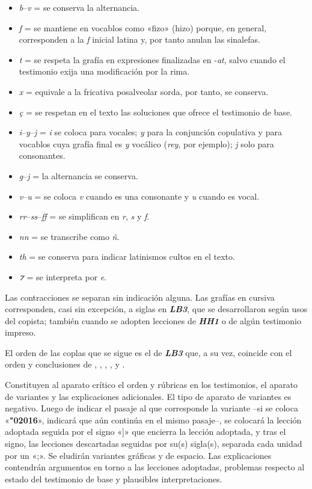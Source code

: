 \documentclass[11pt]{article}
\newcommand{\eg}{{\emph{\textbf{LB3}}}}
\newcommand{\hh}{\emph{\textbf{HH1}}}
\newcommand{\comillas}[1]{«#1»}
\begin{document}
%
\begin{itemize}[label=--]%
\item \emph{b}--\emph{v} = se conserva la alternancia.
\item \emph{f} = se mantiene en vocablos como \comillas{fizo} (hizo) porque, en general, corresponden a la \emph{f} inicial latina y, por tanto anulan las sinalefas.
\item \emph{t} = se respeta la grafía en expresiones finalizadas en -\emph{at}, salvo cuando el testimonio exija una modificación por la rima.
\item \emph{x} = equivale a la fricativa posalveolar sorda, por tanto, se conserva.
\item \emph{ç} = se respetan en el texto las soluciones que ofrece el testimonio de base.
\item \emph{i}--\emph{y}--\emph{j} = \emph{i} se coloca para vocales; \emph{y} para la conjunción copulativa y para vocablos cuya grafía final es \emph{y} vocálico (\emph{rey}, por ejemplo); \emph{j} solo para consonantes.
\item \emph{g}--\emph{j} = la alternancia se conserva.
\item \emph{v}--\emph{u} = se coloca \emph{v} cuando es una consonante y \emph{u} cuando es vocal.
\item \emph{rr}--\emph{ss}--\emph{ff} = se simplifican en \emph{r}, \emph{s} y \emph{f}.
\item \emph{nn} = se transcribe como \emph{ñ}.
\item \emph{th} = se conserva para indicar latinismos cultos en el texto.
\item \emph{⁊} = se interpreta por \emph{e}.%
\end{itemize}\par
%
Las contracciones se separan sin indicación alguna. Las grafías en cursiva corresponden, casi sin excepción, a siglas en {\eg}, que se desarrollaron según usos del copista; también cuando se adopten lecciones de {\hh} o de algún testimonio impreso.\par
%
El orden de las coplas que se sigue es el de {\eg} que, a su vez, coincide con el orden y conclusiones de \textcite{Senabre1983}, \textcite{Palumbo1983}, \textcite{Orduna1967}, \textcite{Beltrán1991,Beltrán2013}, \textcite{PérezPriego1990,PérezPriego2017} y \textcite{Foulché-Delbosc1902}.\par
%
Constituyen al aparato crítico el orden y rúbricas en los testimonios, el aparato de variantes y las explicaciones adicionales. El tipo de aparato de variantes es negativo. Luego de indicar el pasaje al que corresponde la variante --si se coloca \comillas{\textbf{\char"02016}}, indicará que aún continúa en el mismo pasaje--, se colocará la lección adoptada seguida por el signo \comillas{]} que encierra la lección adoptada, y tras el signo, las lecciones descartadas seguidas por su(s) sigla(s), separada cada unidad por un \comillas{;}. Se eludirán variantes gráficas y de espacio. Las explicaciones contendrán argumentos en torno a las lecciones adoptadas, problemas respecto al estado del testimonio de base y plausibles interpretaciones.\par
\repage
%
\end{document}
